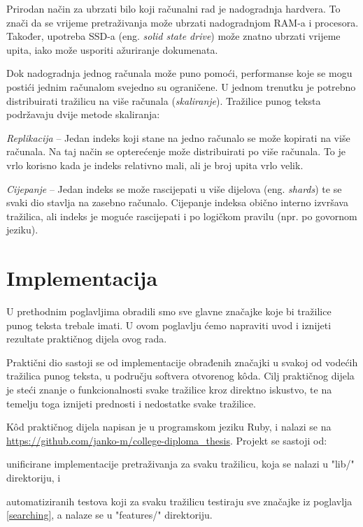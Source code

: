 \documentclass[a4paper,twoside,12pt]{scrreprt}
\begin{document}
Prirodan način za ubrzati bilo koji računalni rad je nadogradnja hardvera. To znači da se vrijeme pretraživanja može ubrzati nadogradnjom RAM-a i procesora. Također, upotreba SSD-a (eng. \textit{solid state drive}) može znatno ubrzati vrijeme upita, iako može usporiti ažuriranje dokumenata.

Dok nadogradnja jednog računala može puno pomoći, performanse koje se mogu postići jednim računalom svejedno su ograničene. U jednom trenutku je potrebno distribuirati tražilicu na više računala (\textit{skaliranje}). Tražilice punog teksta podržavaju dvije metode skaliranja:

\begin{compactenum}
  \item \textit{Replikacija} – Jedan indeks koji stane na jedno računalo se može kopirati na više računala. Na taj način se opterećenje može distribuirati po više računala. To je vrlo korisno kada je indeks relativno mali, ali je broj upita vrlo velik.
  \item \textit{Cijepanje} – Jedan indeks se može rascijepati u više dijelova (eng. \textit{shards}) te se svaki dio stavlja na zasebno računalo. Cijepanje indeksa obično interno izvršava tražilica, ali indeks je moguće rascijepati i po logičkom pravilu (npr. po govornom jeziku).
\end{compactenum}

\chapter{Implementacija}

U prethodnim poglavljima obradili smo sve glavne značajke koje bi tražilice punog teksta trebale imati. U ovom poglavlju ćemo napraviti uvod i iznijeti rezultate praktičnog dijela ovog rada.

Praktični dio sastoji se od implementacije obrađenih značajki u svakoj od vodećih tražilica punog teksta, u području softvera otvorenog kôda. Cilj praktičnog dijela je steći znanje o funkcionalnosti svake tražilice kroz direktno iskustvo, te na temelju toga iznijeti prednosti i nedostatke svake tražilice.

Kôd praktičnog dijela napisan je u programskom jeziku Ruby, i nalazi se na \url{https://github.com/janko-m/college-diploma_thesis}. Projekt se sastoji od:

\begin{compactenum}
  \item unificirane implementacije pretraživanja za svaku tražilicu, koja se nalazi u "lib/" direktoriju, i
  \item automatiziranih testova koji za svaku tražilicu testiraju sve značajke iz poglavlja \ref{searching}, a nalaze se u "features/" direktoriju.
\end{compactenum}
\end{document}
